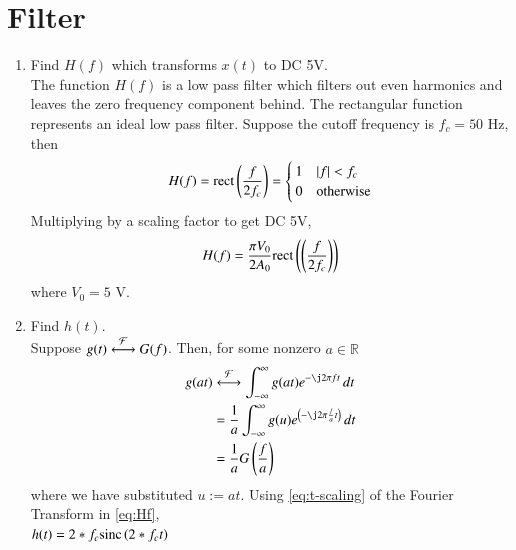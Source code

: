 \documentclass[journal,12pt,twocolumn]{IEEEtran}
\renewcommand\thesection{\arabic{section}}
\begin{document}
\section{Filter}
\begin{enumerate}[label=\thesection.\arabic*
,ref=\thesection.\theenumi]
\item Find $H(f)$ which transforms $x(t)$ to DC 5V.\\
\solution The function $H(f)$ is a low pass filter which filters out
even harmonics and leaves the zero frequency component behind.
The rectangular function represents an ideal low pass filter.
Suppose the cutoff frequency is $f_c = 50$ Hz, then
\begin{align}
H(f) = \text{rect}\left(\frac{f}{2f_c}\right) =
\begin{cases}
1 & \left\vert f\right\vert < f_c \\
0 & \textrm{otherwise}
\end{cases}
\label{eq:Hf}
\end{align}
Multiplying by a scaling factor to get DC 5V,
\begin{align}
H(f) = \frac{\pi V_0}{2A_0}\text{rect}\left(\left(\frac{f}{2f_c}\right)\right)
\end{align}
where $V_0 = 5$ V.
\item Find $h(t)$. \\
\solution Suppose $g(t)\overset{\mathcal{F}}{ \longleftrightarrow}G(f)$. Then, for some
nonzero $a \in \mathbb{R}$
\begin{align}
g(at)&\system{F}\int_{-\infty}^{\infty}g(at)e^{-\j2\pi ft}\, dt \\
&=\frac{1}{a}\int_{-\infty}^{\infty}g(u)e^{\brak{-\j2\pi \frac{f}{a}t}}\, dt \\
&=\frac{1}{a}G\brak{\frac{f}{a}}
\label{eq:t-scaling}
\end{align}
where we have substituted $u := at$. Using
\eqref{eq:t-scaling} of the Fourier Transform in \eqref{eq:Hf}, \\
$h(t) = 2*f_c \text{sinc}\left(2*f_ct\right) $


\end{enumerate}
\end{document}
